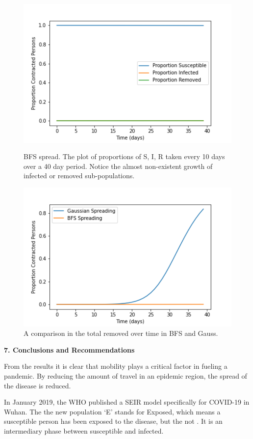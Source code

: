 \documentclass[a4paper]{article}
\begin{document}
\begin{figure}[ht]
  \includegraphics[scale=0.7]{../quarantine/quarantine_plt.png}
  \centering
  \caption{BFS spread. The plot of proportions of S, I, R taken every 10 days 
  over a 40 day period. Notice the almost non-existent growth of infected or
  removed sub-populations.}
  \includegraphics[scale=0.7]{../combined_spread.png}
  \centering
  \caption{A comparison in the total removed over time in BFS and Gauss.}
\end{figure}

\clearpage
\begin{center}
  \textbf{7. Conclusions and Recommendations}
\end{center}

From the results it is clear that mobility plays a critical factor in fueling a
pandemic. By reducing the amount of travel in an epidemic region, the spread of
the disease is reduced.

In January 2019, the WHO published a SEIR model specifically for COVID-19 in
Wuhan. The the new population `E' stands for Exposed, which means a susceptible
person has been exposed to the disease, but the not . It is an intermediary phase between susceptible and infected.

\newpage
\end{document}

